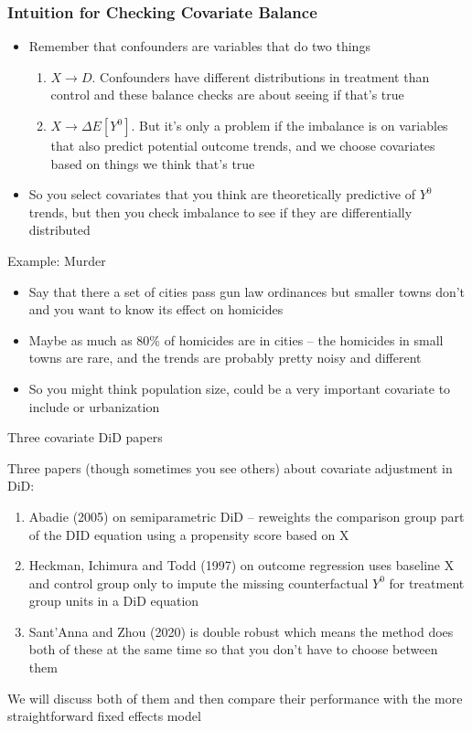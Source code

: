 \documentclass{beamer}
\begin{document}
\begin{frame}
    \frametitle{Intuition for Checking Covariate Balance}
    \begin{itemize}
    \item Remember that confounders are variables that do two things
    	\begin{enumerate}
	\item $X \rightarrow D$. Confounders have different distributions in treatment than control and these balance checks are about seeing if that's true
	\item $X \rightarrow \Delta E[Y^0]$. But it's only a problem if the imbalance is on variables that also predict potential outcome trends, and we choose covariates based on things we think that's true
	\end{enumerate}
\item So you select covariates that you think are theoretically predictive of $Y^0$ trends, but then you check imbalance to see if they are differentially distributed 
    \end{itemize}
\end{frame}


\begin{frame}{Example: Murder}

\begin{itemize}
\item Say that there a set of cities pass gun law ordinances but smaller towns don't and you want to know its effect on homicides
\item Maybe as much as 80\% of homicides are in cities -- the homicides in small towns are rare, and the trends are probably pretty noisy and different
\item So you might think population size, could be a very important covariate to include or urbanization
\end{itemize}

\end{frame}





\begin{frame}{Three covariate DiD papers}

Three papers (though sometimes you see others) about covariate adjustment in DiD:
\begin{enumerate}
\item Abadie (2005) on semiparametric DiD -- reweights the comparison group part of the DID equation using a propensity score based on X
\item Heckman, Ichimura and Todd (1997) on outcome regression uses baseline X and control group only to impute the missing counterfactual $Y^0$ for treatment group units in a DiD equation
\item Sant'Anna and Zhou (2020) is double robust which means the method does both of these at the same time so that you don't have to choose between them
\end{enumerate}

\bigskip

We will discuss both of them and then compare their performance with the more straightforward fixed effects model

\end{frame}
\end{document}
